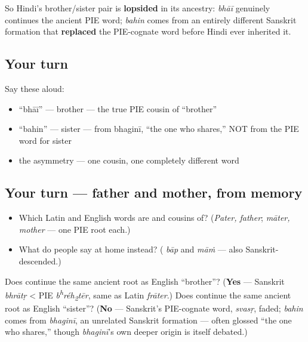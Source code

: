 So Hindi's brother/sister pair is \textbf{lopsided} in its ancestry: \emph{bhāī} genuinely continues the ancient PIE word; \emph{bahin} comes from an entirely different Sanskrit formation that \textbf{replaced} the PIE-cognate word before Hindi ever inherited it.

\subsection*{Your turn}
Say these aloud:

\begin{itemize}
\raggedright
  \item \textquotedblleft{}bhāī\textquotedblright{} — brother — the true PIE cousin of \textquotedblleft{}brother\textquotedblright{}
  \item \textquotedblleft{}bahin\textquotedblright{} — sister — from bhaginī, \textquotedblleft{}the one who shares,\textquotedblright{} NOT from the PIE word for sister
  \item the asymmetry — one cousin, one completely different word
\end{itemize}

\subsection*{Your turn — father and mother, from memory}
\begin{itemize}
\raggedright
  \item Which Latin and English words are \textbf{} and \textbf{} cousins of? (\emph{Pater, father}; \emph{māter, mother} — one PIE root each.)
  \item What do people say at home instead? (\textbf{} \emph{bāp} and \textbf{} \emph{māṁ} — also Sanskrit-descended.)
\end{itemize}

\begin{tcolorbox}[breakable,colback=teal!4,colframe=teal!35!black,title={Before you move on}]
Does \textbf{} continue the same ancient root as English \textquotedblleft{}brother\textquotedblright{}? (\textbf{Yes} — Sanskrit \emph{bhrātṛ} < PIE \emph{b\textsuperscript{h}réh\textsubscript{2}tēr}, same as Latin \emph{frāter}.) Does \textbf{} continue the same ancient root as English \textquotedblleft{}sister\textquotedblright{}? (\textbf{No} — Sanskrit's PIE-cognate word, \emph{svasṛ}, faded; \emph{bahin} comes from \textbf{} \emph{bhaginī}, an unrelated Sanskrit formation — often glossed \textquotedblleft{}the one who shares,\textquotedblright{} though \emph{bhaginī}'s own deeper origin is itself debated.)
\end{tcolorbox}
